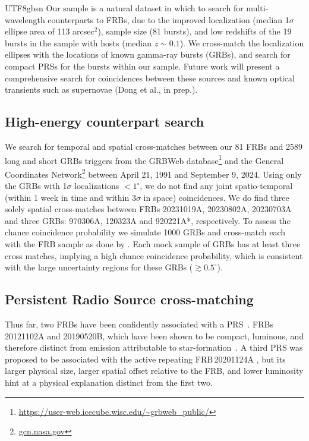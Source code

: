 \documentclass[twocolumn,linenumbers]{aastex631}
\begin{document}
\begin{CJK*}{UTF8}{gbsn}
Our sample is a natural dataset in which to search for multi-wavelength counterparts to FRBs, due to the improved localization (median 1$\sigma$ ellipse area of 113 arcsec$^2$), sample size (81 bursts), and low redshifts of the 19 bursts in the sample with hosts (median $z \sim 0.1$). We cross-match the localization ellipses with the locations of known gamma-ray bursts (GRBs), and search for compact PRSs for the bursts within our sample. Future work will present a comprehensive search for coincidences between these sources and known optical transients such as supernovae (Dong et al., in prep.).

\subsection{High-energy counterpart search}
We search for temporal and spatial cross-matches between our 81 FRBs and 2589 long and short GRBs triggers from the GRBWeb database\footnote{\url{https://user-web.icecube.wisc.edu/\~grbweb_public/}} and the General Coordinates Network\footnote{\url{gcn.nasa.gov}} between April 21, 1991 and September 9, 2024. Using only the GRBs with 1$\sigma$ localizations $<1^\circ$, we do not find any joint spatio-temporal (within 1 week in time and within 3$\sigma$ in space) coincidences. We do find three solely spatial cross-matches between FRBs 20231019A, 20230802A, 20230703A and three GRBs: 970306A, 120323A and 920221A*, respectively. To assess the chance coincidence probability we simulate 1000 GRBs and cross-match each with the FRB sample as done by \citet{Curtin2024}. Each mock sample of GRBs has at least three cross matches, implying a high chance coincidence probability, which is consistent with the large uncertainty regions for these GRBs ($\gtrsim0.5^\circ$).  

\subsection{Persistent Radio Source cross-matching}
Thus far, two FRBs have been confidently associated with a PRS~\citep{chatterjee2017direct, niu2021repeating}. FRBs\,20121102A and 20190520B, which have been shown to be compact, luminous, and therefore distinct from emission attributable to star-formation~\citep{marcote2017repeating,bhandari2023constraints}. A third PRS was proposed to be associated with the active repeating FRB\,20201124A \citep{Bruni2024Nature}, but its larger physical size, larger spatial offset relative to the FRB, and lower luminosity hint at a physical explanation distinct from the first two.


\end{CJK*}
\end{document}

